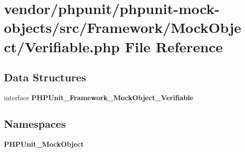 \section{vendor/phpunit/phpunit-\/mock-\/objects/src/\+Framework/\+Mock\+Object/\+Verifiable.php File Reference}
\label{_verifiable_8php}
\subsection*{Data Structures}
\begin{DoxyCompactItemize}
\item 
interface {\bf P\+H\+P\+Unit\+\_\+\+Framework\+\_\+\+Mock\+Object\+\_\+\+Verifiable}
\end{DoxyCompactItemize}
\subsection*{Namespaces}
\begin{DoxyCompactItemize}
\item 
 {\bf P\+H\+P\+Unit\+\_\+\+Mock\+Object}
\end{DoxyCompactItemize}
